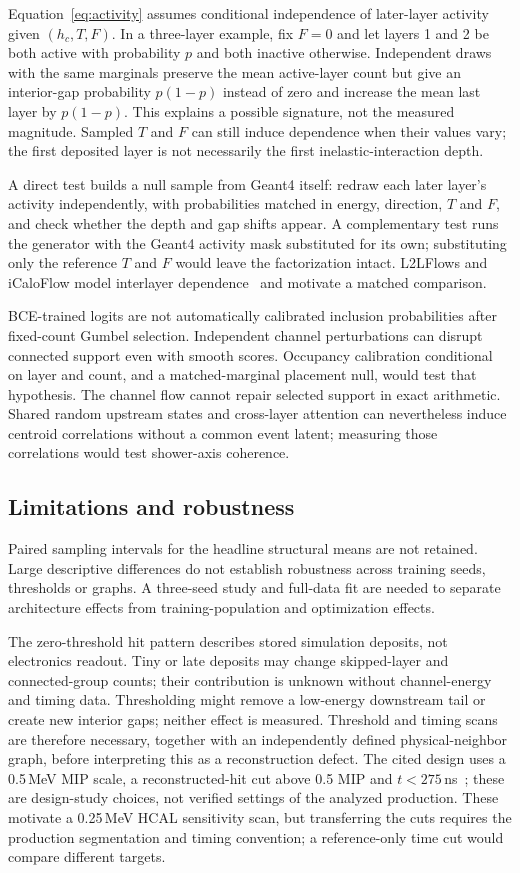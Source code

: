\documentclass[10pt]{article}
\begin{document}
Equation~\eqref{eq:activity} assumes conditional independence of later-layer activity given $(h_c,T,F)$. In a three-layer example, fix $F=0$ and let layers 1 and 2 be both active with probability $p$ and both inactive otherwise. Independent draws with the same marginals preserve the mean active-layer count but give an interior-gap probability $p(1-p)$ instead of zero and increase the mean last layer by $p(1-p)$. This explains a possible signature, not the measured magnitude. Sampled $T$ and $F$ can still induce dependence when their values vary; the first deposited layer is not necessarily the first inelastic-interaction depth.

A direct test builds a null sample from Geant4 itself: redraw each later layer's activity independently, with probabilities matched in energy, direction, $T$ and $F$, and check whether the depth and gap shifts appear. A complementary test runs the generator with the Geant4 activity mask substituted for its own; substituting only the reference $T$ and $F$ would leave the factorization intact. L2LFlows and iCaloFlow model interlayer dependence~\cite{l2lflows,icaloflow} and motivate a matched comparison.

BCE-trained logits are not automatically calibrated inclusion probabilities after fixed-count Gumbel selection. Independent channel perturbations can disrupt connected support even with smooth scores. Occupancy calibration conditional on layer and count, and a matched-marginal placement null, would test that hypothesis. The channel flow cannot repair selected support in exact arithmetic. Shared random upstream states and cross-layer attention can nevertheless induce centroid correlations without a common event latent; measuring those correlations would test shower-axis coherence.

\subsection{Limitations and robustness}

Paired sampling intervals for the headline structural means are not retained. Large descriptive differences do not establish robustness across training seeds, thresholds or graphs. A three-seed study and full-data fit are needed to separate architecture effects from training-population and optimization effects.

The zero-threshold hit pattern describes stored simulation deposits, not electronics readout. Tiny or late deposits may change skipped-layer and connected-group counts; their contribution is unknown without channel-energy and timing data. Thresholding might remove a low-energy downstream tail or create new interior gaps; neither effect is measured. Threshold and timing scans are therefore necessary, together with an independently defined physical-neighbor graph, before interpreting this as a reconstruction defect. The cited design uses a 0.5\,MeV MIP scale, a reconstructed-hit cut above 0.5 MIP and $t<275$\,ns~\cite{epiczdc}; these are design-study choices, not verified settings of the analyzed production. These motivate a 0.25\,MeV HCAL sensitivity scan, but transferring the cuts requires the production segmentation and timing convention; a reference-only time cut would compare different targets.
\end{document}
